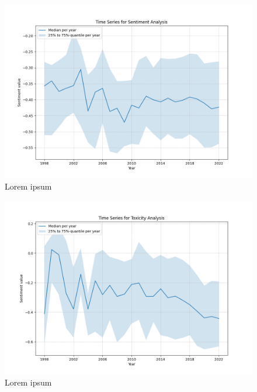 \begin{figure}[!htb]
    \centering
    \includegraphics[width=\textwidth]{figures/time_series_sentiment.png}
    \caption[]{Lorem ipsum}
\end{figure}

\begin{figure}[!htb]
    \centering
    \includegraphics[width=\textwidth]{figures/time_series_toxicity.png}
    \caption[]{Lorem ipsum}
\end{figure}
